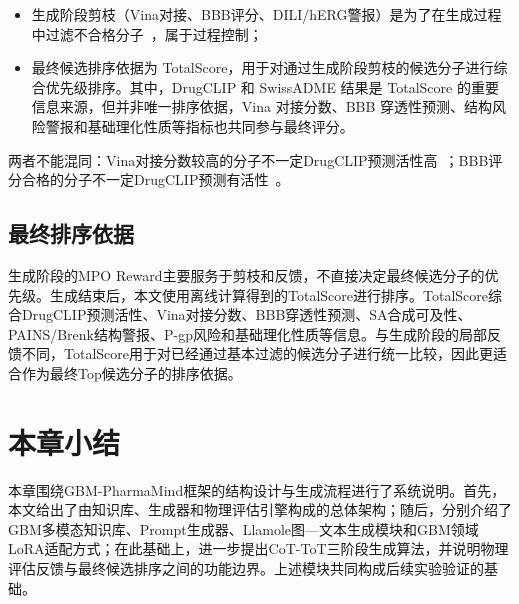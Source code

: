 \begin{itemize}
    \item 生成阶段剪枝（Vina对接、BBB评分、DILI/hERG警报）是为了在生成过程中过滤不合格分子~\cite{Trott2010,Clark2000,Aronov2008}，属于过程控制；
    \item 最终候选排序依据为 TotalScore，用于对通过生成阶段剪枝的候选分子进行综合优先级排序。其中，DrugCLIP 和 SwissADME 结果是 TotalScore 的重要信息来源，但并非唯一排序依据，Vina 对接分数、BBB 穿透性预测、结构风险警报和基础理化性质等指标也共同参与最终评分。
\end{itemize}

两者不能混同：Vina对接分数较高的分子不一定DrugCLIP预测活性高~\cite{Gao2023}；BBB评分合格的分子不一定DrugCLIP预测有活性~\cite{Gao2023}。

\subsection{最终排序依据}

生成阶段的MPO Reward主要服务于剪枝和反馈，不直接决定最终候选分子的优先级。生成结束后，本文使用离线计算得到的TotalScore进行排序。TotalScore综合DrugCLIP预测活性、Vina对接分数、BBB穿透性预测、SA合成可及性、PAINS/Brenk结构警报、P-gp风险和基础理化性质等信息。与生成阶段的局部反馈不同，TotalScore用于对已经通过基本过滤的候选分子进行统一比较，因此更适合作为最终Top候选分子的排序依据。

\section{本章小结}\label{sec:ch3-summary}

本章围绕GBM-PharmaMind框架的结构设计与生成流程进行了系统说明。首先，本文给出了由知识库、生成器和物理评估引擎构成的总体架构；随后，分别介绍了GBM多模态知识库、Prompt生成器、Llamole图—文本生成模块和GBM领域LoRA适配方式；在此基础上，进一步提出CoT-ToT三阶段生成算法，并说明物理评估反馈与最终候选排序之间的功能边界。上述模块共同构成后续实验验证的基础。
